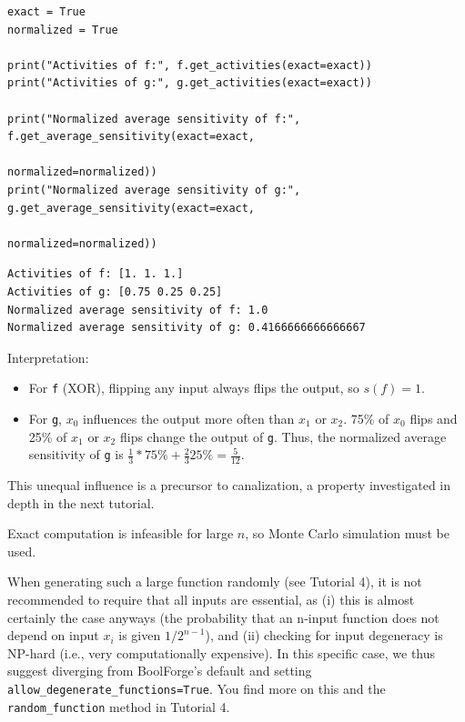\documentclass[
]{article}
\providecommand{\tightlist}{%
  \setlength{\itemsep}{0pt}\setlength{\parskip}{0pt}}
\begin{document}
\begin{lstlisting}
exact = True
normalized = True

print("Activities of f:", f.get_activities(exact=exact))
print("Activities of g:", g.get_activities(exact=exact))

print("Normalized average sensitivity of f:", f.get_average_sensitivity(exact=exact, 
                                                                        normalized=normalized))
print("Normalized average sensitivity of g:", g.get_average_sensitivity(exact=exact, 
                                                                        normalized=normalized))
\end{lstlisting}

\begin{lstlisting}
Activities of f: [1. 1. 1.]
Activities of g: [0.75 0.25 0.25]
Normalized average sensitivity of f: 1.0
Normalized average sensitivity of g: 0.4166666666666667
\end{lstlisting}

Interpretation:

\begin{itemize}
\tightlist
\item
  For \texttt{f} (XOR), flipping any input always flips the output, so
  \(s(f) = 1\).
\item
  For \texttt{g}, \(x_0\) influences the output more often than \(x_1\)
  or \(x_2\). 75\% of \(x_0\) flips and 25\% of \(x_1\) or \(x_2\) flips
  change the output of \texttt{g}. Thus, the normalized average
  sensitivity of \texttt{g} is
  \(\frac 13*75\% + \frac 23 25\% = \frac{5}{12}\).
\end{itemize}

This unequal influence is a precursor to canalization, a property
investigated in depth in the next tutorial.

Exact computation is infeasible for large \(n\), so Monte Carlo
simulation must be used.

When generating such a large function randomly (see Tutorial 4), it is
not recommended to require that all inputs are essential, as (i) this is
almost certainly the case anyways (the probability that an n-input
function does not depend on input \(x_i\) is given \(1/2^{n-1}\)), and
(ii) checking for input degeneracy is NP-hard (i.e., very
computationally expensive). In this specific case, we thus suggest
diverging from BoolForge's default and setting
\texttt{allow\_degenerate\_functions=True}. You find more on this and
the \texttt{random\_function} method in Tutorial 4.
\end{document}
